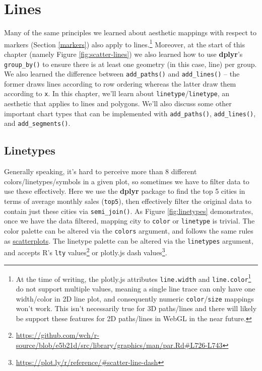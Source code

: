 \documentclass[
  12pt,
]{krantz}
\renewcommand{\href}[2]{#2\footnote{\url{#1}}}
\begin{document}
\hypertarget{lines}{%
\section{Lines}\label{lines}}


Many of the same principles we learned about aesthetic mappings with respect to markers (Section \ref{markers}) also apply to lines.\footnote{At the time of writing, the plotly.js attributes \href{https://github.com/plotly/plotly.js/issues/147}{\texttt{line.width} and \texttt{line.color}} do not support multiple values, meaning a single line trace can only have one width/color in 2D line plot, and consequently numeric \texttt{color}/\texttt{size} mappings won't work. This isn't necessarily true for 3D paths/lines and there will likely be support these features for 2D paths/lines in WebGL in the near future.} Moreover, at the start of this chapter (namely Figure \ref{fig:scatter-lines}) we also learned how to use \textbf{dplyr}'s \texttt{group\_by()} to ensure there is at least one geometry (in this case, line) per group. We also learned the difference between \texttt{add\_paths()} and \texttt{add\_lines()} -- the former draws lines according to row ordering whereas the latter draw them according to \texttt{x}. In this chapter, we'll learn about \texttt{linetype}/\texttt{linetype}, an aesthetic that applies to lines and polygons. We'll also discuss some other important chart types that can be implemented with \texttt{add\_paths()}, \texttt{add\_lines()}, and \texttt{add\_segments()}.

\hypertarget{linetypes}{%
\subsection{Linetypes}\label{linetypes}}


Generally speaking, it's hard to perceive more than 8 different colors/linetypes/symbols in a given plot, so sometimes we have to filter data to use these effectively. Here we use the \textbf{dplyr} package to find the top 5 cities in terms of average monthly sales (\texttt{top5}), then effectively filter the original data to contain just these cities via \texttt{semi\_join()}. As Figure \ref{fig:linetypes} demonstrates, once we have the data filtered, mapping city to \texttt{color} or \texttt{linetype} is trivial. The color palette can be altered via the \texttt{colors} argument, and follows the same rules as \protect\hyperlink{scatterplots}{scatterplots}. The linetype palette can be altered via the \texttt{linetypes} argument, and accepts R's \href{https://github.com/wch/r-source/blob/e5b21d/src/library/graphics/man/par.Rd\#L726-L743}{\texttt{lty} values} or plotly.js \href{https://plot.ly/r/reference/\#scatter-line-dash}{dash values}.
\end{document}
